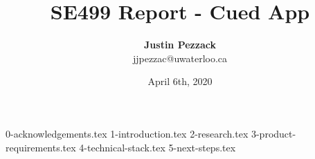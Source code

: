 \documentclass[titlepage]{article}
\title{SE499 Report - Cued App}
\author{\textbf{Justin Pezzack} \\
    jjpezzac@uwaterloo.ca}
\date{April 6th, 2020}
\begin{document}
\maketitle

\tableofcontents
\newpage

{0-acknowledgements.tex}
\newpage
{1-introduction.tex}
{2-research.tex}
{3-product-requirements.tex}
{4-technical-stack.tex}
{5-next-steps.tex}
\newpage

    
\end{document}
